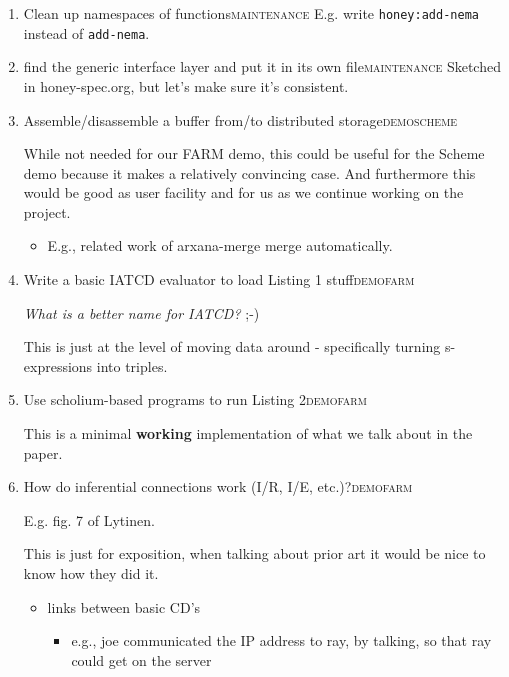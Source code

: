 \documentclass[11pt]{article}
\begin{document}
\begin{enumerate}
\item Clean up namespaces of functions\hfill{}\textsc{maintenance}
\label{sec:org0669302}
E.g. write \texttt{honey:add-nema} instead of \texttt{add-nema}.
\item find the generic interface layer and put it in its own file\hfill{}\textsc{maintenance}
\label{sec:org0d8ddab}
Sketched in honey-spec.org, but let's make sure it's consistent.
\item Assemble/disassemble a buffer from/to distributed storage\hfill{}\textsc{demoscheme}
\label{sec:orgf563742}

While not needed for our FARM demo, this could be useful for the
Scheme demo because it makes a relatively convincing case.  And
furthermore this would be good as user facility and for us as we
continue working on the project.

\begin{itemize}
\item E.g., related work of arxana-merge merge automatically.
\end{itemize}

\item Write a basic IATCD evaluator to load Listing 1 stuff\hfill{}\textsc{demofarm}
\label{sec:org208591c}

\emph{What is a better name for IATCD?} ;-)

This is just at the level of moving data around - specifically turning
s-expressions into triples.

\item Use scholium-based programs to run Listing 2\hfill{}\textsc{demofarm}
\label{sec:org1a72e21}

This is a minimal \textbf{working} implementation of what we talk about in the paper.

\item How do inferential connections work (I/R, I/E, etc.)?\hfill{}\textsc{demofarm}
\label{sec:org30a409d}

E.g. fig. 7 of Lytinen.

This is just for exposition, when talking about prior art it would be nice to know how they did it.

\begin{itemize}
\item links between basic CD's
\begin{itemize}
\item e.g., joe communicated the IP address to ray, by talking, so that ray could get on the server
\end{itemize}
\end{itemize}
\end{enumerate}
\end{document}
